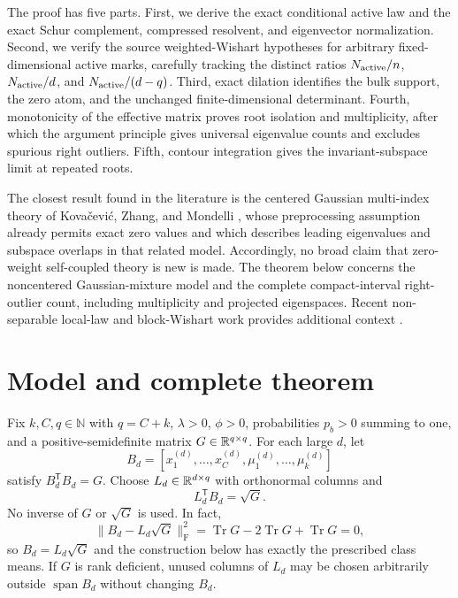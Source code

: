 The proof has five parts. First, we derive the exact conditional active law and the exact Schur complement, compressed resolvent, and eigenvector normalization. Second, we verify the source weighted-Wishart hypotheses for arbitrary fixed-dimensional active marks, carefully tracking the distinct ratios $N_{\rm active}/n$, $N_{\rm active}/d$, and $N_{\rm active}/(d-q)$. Third, exact dilation identifies the bulk support, the zero atom, and the unchanged finite-dimensional determinant. Fourth, monotonicity of the effective matrix proves root isolation and multiplicity, after which the argument principle gives universal eigenvalue counts and excludes spurious right outliers. Fifth, contour integration gives the invariant-subspace limit at repeated roots.

The closest result found in the literature is the centered Gaussian multi-index theory of Kova\v{c}evi\'c, Zhang, and Mondelli \cite{KovacevicEtAl2025}, whose preprocessing assumption already permits exact zero values and which describes leading eigenvalues and subspace overlaps in that related model. Accordingly, no broad claim that zero-weight self-coupled theory is new is made. The theorem below concerns the noncentered Gaussian-mixture model and the complete compact-interval right-outlier count, including multiplicity and projected eigenspaces. Recent non-separable local-law and block-Wishart work provides additional context \cite{FanEtAl2026,MontanariSaeed2026}.

\section{Model and complete theorem}

Fix $k,C,q\in\mathbb{N}$ with $q=C+k$, $\lambda>0$, $\phi>0$, probabilities $p_b>0$ summing to one, and a positive-semidefinite matrix $G\in\mathbb{R}^{q\times q}$. For each large $d$, let
\begin{equation}
B_d=[x_1^{(d)},\ldots,x_C^{(d)},\mu_1^{(d)},\ldots,\mu_k^{(d)}]
\end{equation}
satisfy $B_d^{\mathsf T}B_d=G$. Choose $L_d\in\mathbb{R}^{d\times q}$ with orthonormal columns and
\begin{equation}
L_d^{\mathsf T}B_d=\sqrt G.
\end{equation}
No inverse of $G$ or $\sqrt G$ is used. In fact,
\begin{equation}
\|B_d-L_d\sqrt G\|_{\mathrm F}^2
=\operatorname{Tr}G-2\operatorname{Tr}G+\operatorname{Tr}G=0,
\label{S:polar-identity}
\end{equation}
so $B_d=L_d\sqrt G$ and the construction below has exactly the prescribed
class means. If $G$ is rank deficient, unused columns of $L_d$ may be chosen
arbitrarily outside $\operatorname{span}B_d$ without changing $B_d$.

